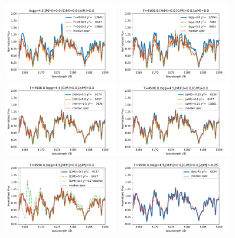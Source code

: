 \documentclass[preprint,trackchanges]{aastex61}
\begin{document}
\begin{figure}[!hbtp]
\begin{centering}
\includegraphics[width=0.45\textwidth]{T_EFF_exploration.pdf}
\includegraphics[width=0.45\textwidth]{LOGG_exploration.pdf}
\includegraphics[width=0.45\textwidth]{MH_exploration.pdf}
\includegraphics[width=0.45\textwidth]{ALPHA_exploration.pdf}
\includegraphics[width=0.45\textwidth]{CM_exploration.pdf}
\includegraphics[width=0.45\textwidth]{FINAL_exploration.pdf}

\end{centering}
\end{figure}
\end{document}
